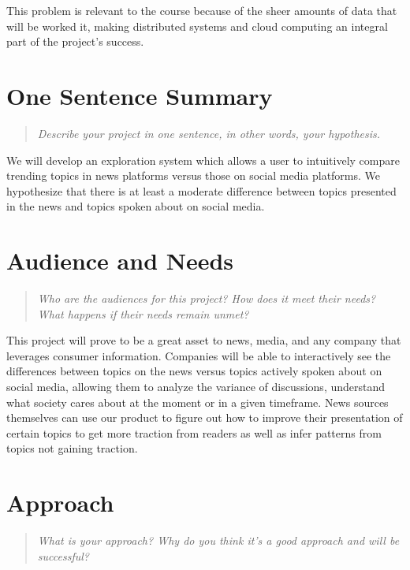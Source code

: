 \documentclass{proc}
\begin{document}
This problem is relevant to the course because of the sheer amounts of data that will be worked it, making distributed systems and cloud computing an integral part of the project's success.

\section{One Sentence Summary}
\begin{quote}
\emph{Describe your project in one sentence, in other words, your hypothesis.}
\end{quote}

We will develop an exploration system which allows a user to intuitively compare trending topics in news platforms versus those on social media platforms.  We hypothesize that there is at least a moderate difference between topics presented in the news and topics spoken about on social media.

\section{Audience and Needs}
\begin{quote}
\emph{Who are the audiences for this project? 
How does it meet their needs? 
What happens if their needs remain unmet?}
\end{quote}

This project will prove to be a great asset to news, media, and any company that leverages consumer information.  Companies will be able to interactively see the differences between topics on the news versus topics actively spoken about on social media, allowing them to analyze the variance of discussions, understand what society cares about at the moment or in a given timeframe. News sources themselves can use our product to figure out how to improve their presentation of certain topics to get more traction from readers as well as infer patterns from topics not gaining traction.

\section{Approach}
\begin{quote}
\emph{What is your approach?
Why do you think it's a good approach and will be successful?}
\end{quote}
\end{document}
